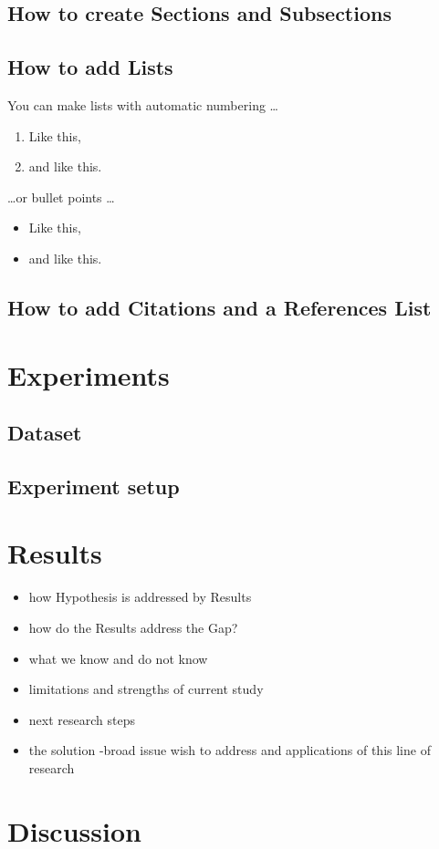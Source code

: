 \documentclass[a4paper]{article}
\begin{document}
\subsection{How to create Sections and Subsections}
\subsection{How to add Lists}
You can make lists with automatic numbering \dots
\begin{enumerate}
\item Like this,
\item and like this.
\end{enumerate}
\dots or bullet points \dots
\begin{itemize}
\item Like this,
\item and like this.
\end{itemize}

\subsection{How to add Citations and a References List}

\section{Experiments}
\subsection{Dataset}
\subsection{Experiment setup}
\section{Results}
\begin{itemize}
\item  how Hypothesis is addressed by Results
\item  how do the Results address the Gap?
\item  what we know and do not know
\item  limitations and strengths of current study
\item  next research steps
\item  the solution -broad issue wish to address and applications of this line of research 
\end{itemize}
\section{Discussion}



\end{document}
